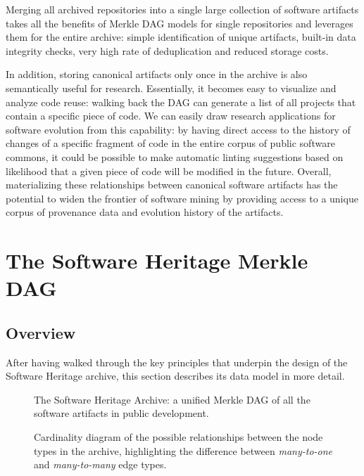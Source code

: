 Merging all archived repositories into a single large collection of software
artifacts takes all the benefits of Merkle \gls{DAG} models for single
repositories and leverages them for the entire archive: simple identification
of unique artifacts, built-in data integrity checks, very high rate of
deduplication and reduced storage costs.

In addition, storing canonical artifacts only once in the archive is also
semantically useful for research. Essentially, it becomes easy to visualize
and analyze code reuse: walking back the \gls{DAG} can generate a list of all
projects that contain a specific piece of code.
We can easily draw research applications for software evolution from this
capability: by having direct access to the history of changes of a specific
fragment of code in the entire corpus of public software commons, it could be
possible to make automatic linting suggestions based on likelihood that a given
piece of code will be modified in the future. Overall, materializing these
relationships between canonical software artifacts has the potential to widen
the frontier of software mining by providing access to a unique corpus of
provenance data and evolution history of the artifacts.


\section{The Software Heritage Merkle DAG}

\subsection{Overview}

After having walked through the key principles that underpin the design of the
Software Heritage archive, this section describes its data model in more
detail.

\begin{figure}
    \centering
    
    \caption{The Software Heritage Archive: a unified Merkle \gls{DAG} of all
    the software artifacts in public development.}%
    \label{fig:swh-model}
\end{figure}

\begin{figure}
    \centering
    
    \caption{Cardinality diagram of the possible relationships between the node
    types in the archive, highlighting the difference between
    \emph{many-to-one} and \emph{many-to-many} edge types.}%
    \label{fig:swh-cardinality}
\end{figure}

